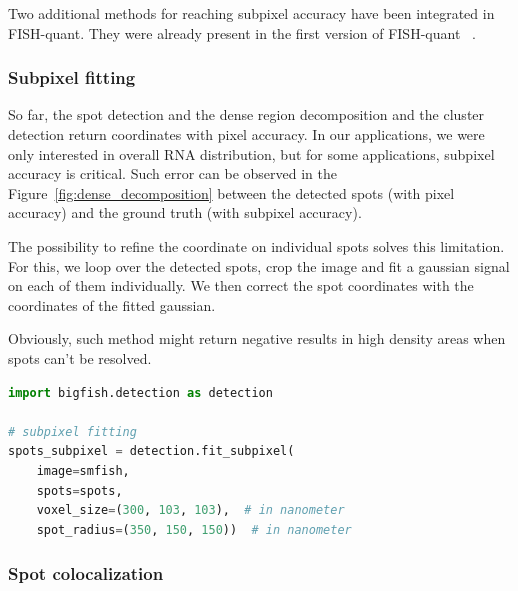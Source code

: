 Two additional methods for reaching subpixel accuracy have been integrated in FISH-quant. They were already present in the first version of FISH-quant ~\cite{mueller_fish-quant_2013}.

\subsubsection{Subpixel fitting}

So far, the spot detection and the dense region decomposition and the cluster detection return coordinates with pixel accuracy.
In our applications, we were only interested in overall \ac{RNA} distribution, but for some applications, subpixel accuracy is critical.
Such error can be observed in the Figure~\ref{fig:dense_decomposition} between the detected spots (with pixel accuracy) and the ground truth (with subpixel accuracy).

The possibility to refine the coordinate on individual spots solves this limitation.
For this, we loop over the detected spots, crop the image and fit a gaussian signal on each of them individually.
We then correct the spot coordinates with the coordinates of the fitted gaussian.

Obviously, such method might return negative results in high density areas when spots can't be resolved.\\

\begin{minipage}{0.9\textwidth}
\begin{lstlisting}[language=Python]
import bigfish.detection as detection

# subpixel fitting
spots_subpixel = detection.fit_subpixel(
    image=smfish,
    spots=spots,
    voxel_size=(300, 103, 103),  # in nanometer
    spot_radius=(350, 150, 150))  # in nanometer
\end{lstlisting}
\end{minipage}

\subsubsection{Spot colocalization}

